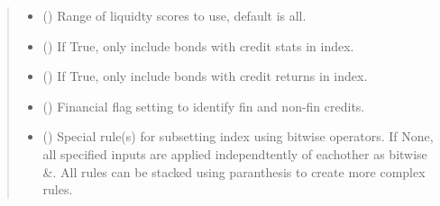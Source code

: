\documentclass[letterpaper,10pt,english]{report}
\begin{document}
\begin{fulllineitems}
\begin{fulllineitems}
\begin{quote}
\begin{description}
\begin{itemize}
\item {} 
 (\sphinxstyleliteralemphasis{\sphinxupquote{{[}}}\sphinxstyleliteralemphasis{\sphinxupquote{, }}\sphinxstyleliteralemphasis{\sphinxupquote{{]}}}\sphinxstyleliteralemphasis{\sphinxupquote{, }}\sphinxstyleliteralemphasis{\sphinxupquote{(}}\sphinxstyleliteralemphasis{\sphinxupquote{, }}\sphinxstyleliteralemphasis{\sphinxupquote{)}}\sphinxstyleliteralemphasis{\sphinxupquote{}}) \textendash{} Range of liquidty scores to use, default is all.

\item {} 
 (\sphinxstyleliteralemphasis{\sphinxupquote{, }}) \textendash{} If True, only include bonds with credit stats in index.

\item {} 
 (\sphinxstyleliteralemphasis{\sphinxupquote{, }}) \textendash{} If True, only include bonds with credit returns in index.

\item {} 
 (\sphinxstyleliteralemphasis{\sphinxupquote{, }}\sphinxstyleliteralemphasis{\sphinxupquote{, }}\sphinxstyleliteralemphasis{\sphinxupquote{, }}) \textendash{} Financial flag setting to identify fin and non-fin credits.

\item {} 
 (\sphinxstyleliteralemphasis{\sphinxupquote{, }}\sphinxstyleliteralemphasis{\sphinxupquote{{[}}}\sphinxstyleliteralemphasis{\sphinxupquote{{]} }}) \textendash{} 
Special rule(s) for subsetting index using bitwise operators.
If None, all specified inputs are applied independtently of
eachother as bitwise \&. All rules can be stacked using paranthesis
to create more complex rules.


\end{itemize}
\end{description}
\end{quote}
\end{fulllineitems}
\end{fulllineitems}
\end{document}
